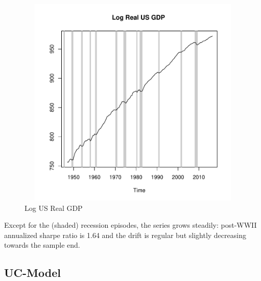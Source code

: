 \documentclass[a4paper]{book}
\begin{document}
\begin{figure}[H]\begin{center}\includegraphics[height=4in, width=6in]{z_us_real_log_gdp}\caption{Log US Real GDP\label{z_us_real_log_gdp}}\end{center}\end{figure}Except for the (shaded) recession episodes, the series grows steadily: post-WWII annualized sharpe ratio is 1.64 and the drift is  regular but slightly decreasing towards the sample end. 


\subsection{UC-Model}
\end{document}
